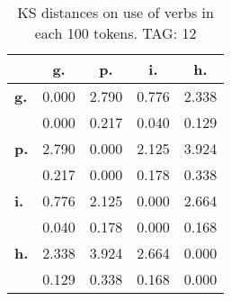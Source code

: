 \begin{table}[h!]
\begin{center}
\begin{tabular}{| l || c | c | c | c |}\hline
 & {\bf g.} & {\bf p.} & {\bf i.} & {\bf h.} \\\hline\hline
{\bf g.} & 0.000 & 2.790 & 0.776 & 2.338 \\
{\bf } & 0.000 & 0.217 & 0.040 & 0.129 \\\hline
{\bf p.} & 2.790 & 0.000 & 2.125 & 3.924 \\
{\bf } & 0.217 & 0.000 & 0.178 & 0.338 \\\hline
{\bf i.} & 0.776 & 2.125 & 0.000 & 2.664 \\
{\bf } & 0.040 & 0.178 & 0.000 & 0.168 \\\hline
{\bf h.} & 2.338 & 3.924 & 2.664 & 0.000 \\
{\bf } & 0.129 & 0.338 & 0.168 & 0.000 \\\hline
\end{tabular}
\caption{KS distances on use of verbs in each 100 tokens. TAG: 12}
\end{center}
\end{table}